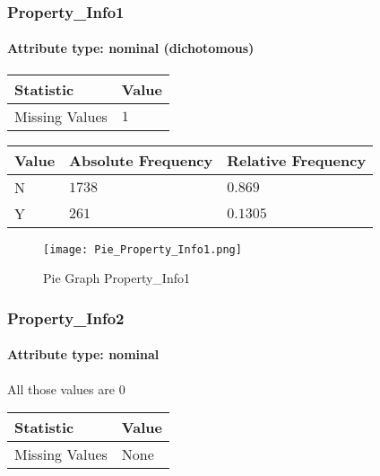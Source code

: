 \subsubsection{Property\_Info1}
\paragraph{Attribute type: nominal (dichotomous)}
\begin{table}[H]
	\renewcommand{\arraystretch}{1.25}
	\begin{tabular}{l|l}
		\textbf{Statistic} & \textbf{Value}\\\hline
		Missing Values& $1$\\\hline
	\end{tabular}
\end{table}
\begin{table}[H]
	\renewcommand{\arraystretch}{1.25}
	\begin{tabular}{l|l|l}
		\textbf{Value} & \textbf{Absolute Frequency} & \textbf{Relative Frequency}\\\hline
		N&$1738$&$0.869$\\\hline
		Y&$261$&$0.1305$
\end{tabular}
\end{table}

\begin{figure}[H]
	\begin{center}
		\texttt{[image: Pie\_Property\_Info1.png]}
	\end{center}
	\caption{Pie Graph Property\_Info1}
\end{figure}

\subsubsection{Property\_Info2}
\paragraph{Attribute type: nominal} All those values are $0$

\begin{table}[H]
	\renewcommand{\arraystretch}{1.25}
	\begin{tabular}{l|l}
		\textbf{Statistic} & \textbf{Value}\\\hline
		Missing Values& None\\\hline
	\end{tabular}
\end{table}


